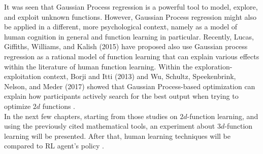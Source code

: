 It was seen that Gaussian Process regression is a powerful tool to model, explore, and exploit unknown functions. However, Gaussian Process regression might also be applied in a different, more psychological context, namely as a model of human cognition in general and function learning in particular. Recently, Lucas, Giffiths, Williams, and Kalish (2015) have proposed also use Gaussian process regression as a rational model of function learning that can explain various effects within the literature of human function learning. Within the exploration-exploitation context, Borji and Itti (2013) and Wu, Schultz, Speekenbrink, Nelson, and Meder (2017) showed that Gaussian Process-based optimization can explain how participants actively search for the best output when trying to optimize $2d$ functions \cite{Schulz095190}.\\

In the next few chapters, starting from those studies on $2d$-function learning, and using the previously cited mathematical tools, an experiment about $3d$-function learning will be presented. After that, human learning techniques will be compared to RL agent's policy .